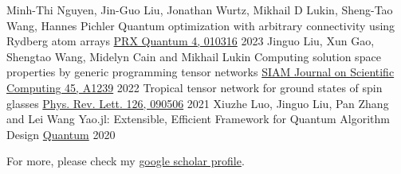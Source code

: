 \documentclass[11pt, a4paper]{awesome-cv}
\begin{document}
%
%
\begin{cventries}
  \cventry
    {Minh-Thi Nguyen, Jin-Guo Liu, Jonathan Wurtz, Mikhail D Lukin, Sheng-Tao Wang, Hannes Pichler} %
    {Quantum optimization with arbitrary connectivity using Rydberg atom arrays} %
    {\href{https://journals.aps.org/prxquantum/abstract/10.1103/PRXQuantum.4.010316}{PRX Quantum 4, 010316}} %
    {2023} %
    {
    }
  \cventry
    {Jinguo Liu, Xun Gao, Shengtao Wang, Midelyn Cain and Mikhail Lukin} %
    {Computing solution space properties by generic programming tensor networks} %
    {\href{https://epubs.siam.org/doi/full/10.1137/22M1501787}{SIAM Journal on Scientific Computing 45, A1239}} %
    {2022} %
    {}
  {Tropical tensor network for ground states of spin glasses}
    {\href{https://journals.aps.org/prl/abstract/10.1103/PhysRevLett.126.090506}{Phys. Rev. Lett. 126, 090506}}
  {2021}
  {
  }
  \cventry
    {Xiuzhe Luo, Jinguo Liu, Pan Zhang and Lei Wang} %
    {Yao.jl: Extensible, Efficient Framework for Quantum Algorithm Design} %
    {\href{https://quantum-journal.org/papers/q-2020-10-11-341/}{Quantum}} %
    {2020} %
    {
    }
\end{cventries}

For more, please check my \href{https://scholar.google.com/citations?view_op=list_works&hl=zh-CN&hl=zh-CN&user=4edw228AAAAJ&sortby=pubdate}{google scholar profile}.
\end{document}
